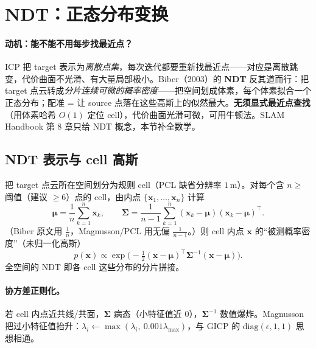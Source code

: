 \section{NDT：正态分布变换}
\label{sec:pc-ndt}

\paragraph{动机：能不能不用每步找最近点？}
ICP 把 target 表示为\emph{离散点集}，每次迭代都要重新找最近点——对应是离散跳变，代价曲面不光滑、有大量局部极小。Biber（2003）的 \textbf{NDT}\cite{biber2003ndt} 反其道而行：把 target 点云转成\emph{分片连续可微的概率密度}——把空间划成体素，每个体素拟合一个正态分布；配准 = 让 source 点落在这些高斯上的似然最大。\textbf{无须显式最近点查找}（用体素哈希 $O(1)$ 定位 cell），代价曲面光滑可微，可用牛顿法。SLAM Handbook 第 8 章只给 NDT 概念，本节补全数学。

\subsection{NDT 表示与 cell 高斯}
\label{sec:pc-ndt-rep}

\begin{derivation}
把 target 点云所在空间划分为规则 cell（PCL 缺省分辨率 $1\,\mathrm{m}$）。对每个含 $n\ge$ 阈值（建议 $\ge6$）点的 cell，由内点 $\{\mathbf{x}_1,\dots,\mathbf{x}_n\}$ 计算
\begin{equation}
  \boldsymbol{\mu}=\frac{1}{n}\sum_{k=1}^{n}\mathbf{x}_k,\qquad
  \boldsymbol{\Sigma}=\frac{1}{n-1}\sum_{k=1}^{n}(\mathbf{x}_k-\boldsymbol{\mu})(\mathbf{x}_k-\boldsymbol{\mu})^\top.
  \label{eq:pc-ndt-musigma}
\end{equation}
（Biber 原文用 $\frac{1}{n}$，Magnusson/PCL 用无偏 $\frac{1}{n-1}$。）则 cell 内点 $\mathbf{x}$ 的“被测概率密度”（未归一化高斯）
\begin{equation}
  p(\mathbf{x})\propto\exp\!\Big(-\tfrac12(\mathbf{x}-\boldsymbol{\mu})^\top\boldsymbol{\Sigma}^{-1}(\mathbf{x}-\boldsymbol{\mu})\Big).
  \label{eq:pc-ndt-density}
\end{equation}
全空间的 NDT 即各 cell 这些分布的分片拼接。
\end{derivation}

\paragraph{协方差正则化。}
若 cell 内点近共线/共面，$\boldsymbol{\Sigma}$ 病态（小特征值近 $0$），$\boldsymbol{\Sigma}^{-1}$ 数值爆炸。Magnusson 把过小特征值抬升：$\lambda_i\leftarrow\max(\lambda_i,\ 0.001\lambda_{\max})$，与 GICP 的 $\mathrm{diag}(\epsilon,1,1)$ 思想相通。

